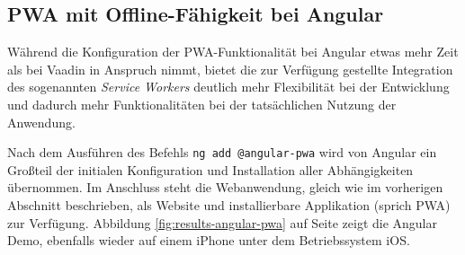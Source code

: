 \documentclass[a4paper,12pt,twoside]{scrreprt}
\begin{document}
\subsection{\acs{PWA} mit Offline-Fähigkeit bei Angular}
\label{sub-sec:results-pwa-angular}
Während die Konfiguration der \ac{PWA}-Funktionalität bei Angular etwas mehr Zeit als bei Vaadin in Anspruch nimmt, bietet die zur Verfügung gestellte Integration des sogenannten \textit{Service Workers} deutlich mehr Flexibilität bei der Entwicklung und dadurch mehr Funktionalitäten bei der tatsächlichen Nutzung der Anwendung.

\medskip

Nach dem Ausführen des Befehls \texttt{ng add @angular-pwa} wird von Angular ein Großteil der initialen Konfiguration und Installation aller Abhängigkeiten übernommen. Im Anschluss steht die Webanwendung, gleich wie im vorherigen Abschnitt beschrieben, als Website und installierbare Applikation (sprich \ac{PWA}) zur Verfügung. Abbildung \ref{fig:results-angular-pwa} auf Seite \pageref{fig:results-angular-pwa} zeigt die Angular Demo, ebenfalls wieder auf einem iPhone unter dem Betriebssystem iOS.
\end{document}
